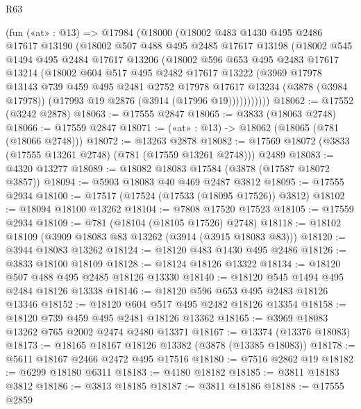\begin{lexlean}{R63}
\begin{coremodule}
    (fun («at» : @13) =>
    @17984
      (@18000
        (@18002
          @483
          @1430
          @495
          @2486
          @17617
          @13190
          (@18002
            @507
            @488
            @495
            @2485
            @17617
            @13198
            (@18002
              @545
              @1494
              @495
              @2484
              @17617
              @13206
              (@18002
                @596
                @653
                @495
                @2483
                @17617
                @13214
                (@18002
                  @604
                  @517
                  @495
                  @2482
                  @17617
                  @13222
                  (@3969
                    @17978
                    @13143
                    @739
                    @459
                    @495
                    @2481
                    @2752
                    @17978
                    @17617
                    @13234
                    (@3878 (@3984 @17978))
                    (@17993 @19 @2876 (@3914 (@17996 @19)))))))))))
@18062 := @17552 (@3242 @2878)
@18063 := @17555 @2847
@18065 := @3833 (@18063 @2748)
@18066 := @17559 @2847
@18071 := («at» : @13) -> @18062 (@18065 (@781 (@18066 @2748)))
@18072 := @13263 @2878
@18082 := @17569 @18072 (@3833 (@17555 @13261 @2748) (@781 (@17559 @13261 @2748))) @2489
@18083 := @4320 @13277
@18089 := @18082 @18083 @17584 (@3878 (@17587 @18072 @3857))
@18094 := @5903 @18083 @40 @469 @2487 @3812
@18095 := @17555 @2934
@18100 := @17517 (@17524 (@17533 (@18095 @17526)) @3812)
@18102 := @18094 @18100 @13262
@18104 := @7808 @17520 @17523
@18105 := @17559 @2934
@18109 := @781 (@18104 (@18105 @17526) @2748)
@18118 := @18102 @18109 (@3909 @18083 @83 @13262 (@3914 (@3915 @18083 @83)))
@18120 := @3944 @18083 @13262
@18124 := @18120 @483 @1430 @495 @2486
@18126 := @3833 @18100 @18109
@18128 := @18124 @18126 @13322
@18134 := @18120 @507 @488 @495 @2485 @18126 @13330
@18140 := @18120 @545 @1494 @495 @2484 @18126 @13338
@18146 := @18120 @596 @653 @495 @2483 @18126 @13346
@18152 := @18120 @604 @517 @495 @2482 @18126 @13354
@18158 := @18120 @739 @459 @495 @2481 @18126 @13362
@18165 := @3969 @18083 @13262 @765 @2002 @2474 @2480 @13371
@18167 := @13374 (@13376 @18083)
@18173 := @18165 @18167 @18126 @13382 (@3878 (@13385 @18083))
@18178 := @5611 @18167 @2466 @2472 @495 @17516
@18180 := @7516 @2862 @19
@18182 := @6299 @18180 @6311
@18183 := @4180 @18182
@18185 := @3811 @18183 @3812
@18186 := @3813 @18185
@18187 := @3811 @18186
@18188 := @17555 @2859

\end{coremodule}
\end{lexlean}
